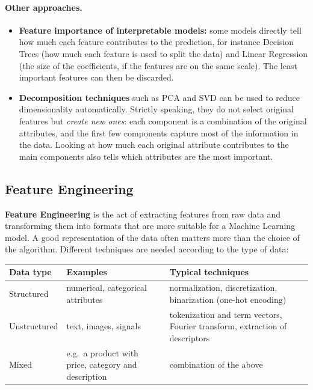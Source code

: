 \paragraph{Other approaches.}
\begin{itemize}
    \item \textbf{Feature importance of interpretable models:} some models directly tell how much each feature contributes to the prediction, for instance Decision Trees (how much each feature is used to split the data) and Linear Regression (the size of the coefficients, if the features are on the same scale). The least important features can then be discarded.
    \item \textbf{Decomposition techniques} such as PCA and SVD can be used to reduce dimensionality automatically. Strictly speaking, they do not select original features but \emph{create new ones}: each component is a combination of the original attributes, and the first few components capture most of the information in the data. Looking at how much each original attribute contributes to the main components also tells which attributes are the most important.
\end{itemize}

\subsection{Feature Engineering}
\textbf{Feature Engineering} is the act of extracting features from raw data and transforming them into formats that are more suitable for a Machine Learning model. A good representation of the data often matters more than the choice of the algorithm. Different techniques are needed according to the type of data:

\begin{center}
    \small
    \renewcommand{\arraystretch}{1.3}
    \begin{tabular}{|l|p{3.6cm}|p{5.2cm}|}
    \hline
    \textbf{Data type} & \textbf{Examples} & \textbf{Typical techniques} \\
    \hline
    Structured & numerical, categorical attributes & normalization, discretization, binarization (one-hot encoding) \\
    \hline
    Unstructured & text, images, signals & tokenization and term vectors, Fourier transform, extraction of descriptors \\
    \hline
    Mixed & e.g.\ a product with price, category and description & combination of the above \\
    \hline
    \end{tabular}
\end{center}

